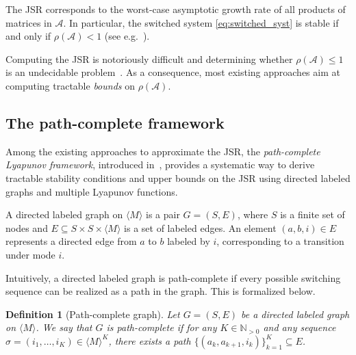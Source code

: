 \documentclass[letterpaper, 10 pt, conference]{ieeeconf}  %
\newcommand{\Mset}{\langle M\rangle}
\newtheorem{definition}{Definition}
\begin{document}
The JSR corresponds to the worst-case asymptotic growth
rate of all products of matrices in $\mathcal A$. In particular, the
switched system \eqref{eq:switched_syst} is stable
if and only if $\rho(\mathcal A) < 1$ (see e.g.~\cite[Corollary 1.1]{jungers2009joint}).

Computing the JSR is
notoriously difficult and determining whether $\rho(\mathcal A)\le 1$
is an undecidable problem~\cite[Theorem 2]{blondel2000boundedness}. As a consequence,
most existing approaches aim at computing tractable \emph{bounds}
on $\rho(\mathcal A)$.

\subsection{The path-complete framework}
Among the existing approaches to approximate the JSR, the \emph{path-complete Lyapunov framework}, introduced in~\cite{ahmadi2014joint},
provides a systematic way to derive tractable stability conditions and
upper bounds on the JSR using directed labeled graphs and multiple
Lyapunov functions.

A directed labeled
graph on $\Mset$ is a pair $G=(S,E)$, where $S$ is a finite set
of nodes and $E \subseteq S \times S \times \Mset$ is a set of
labeled edges. An element $(a,b,i)\in E$ represents a directed edge from
$a$ to $b$ labeled by $i$, corresponding to a transition under mode $i$.

Intuitively, a directed labeled graph is path-complete if every possible switching
sequence can be realized as a path in the graph. This is formalized below.

\begin{definition}[Path-complete graph] \label{def:PC}
Let $G = (S,E)$ be a directed labeled graph on $\Mset$.
We say that $G$ is \emph{path-complete} if for any $K\in\mathbb{N}_{>0}$
and any sequence $\sigma = (i_1,\ldots,i_K)\in\Mset^K$, there
exists a path 
$\{(a_k,a_{k+1}, i_k)\}_{k=1}^K\subseteq E$.
\end{definition}
\end{document}
